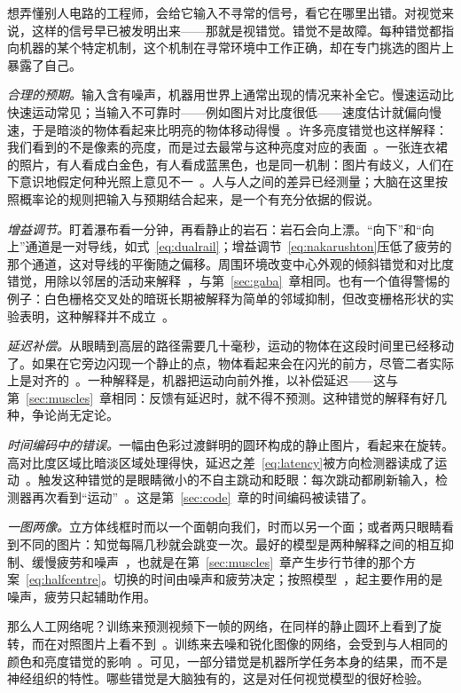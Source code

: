 想弄懂别人电路的工程师，会给它输入不寻常的信号，看它在哪里出错。对视觉来说，这样的信号早已被发明出来——那就是视错觉。错觉不是故障。每种错觉都指向机器的某个特定机制，这个机制在寻常环境中工作正确，却在专门挑选的图片上暴露了自己。

\emph{合理的预期。}输入含有噪声，机器用世界上通常出现的情况来补全它。慢速运动比快速运动常见；当输入不可靠时——例如图片对比度很低——速度估计就偏向慢速，于是暗淡的物体看起来比明亮的物体移动得慢~\cite{Weiss2002}。许多亮度错觉也这样解释：我们看到的不是像素的亮度，而是过去最常与这种亮度对应的表面~\cite{Purves2011}。一张连衣裙的照片，有人看成白金色，有人看成蓝黑色，也是同一机制：图片有歧义，人们在下意识地假定何种光照上意见不一~\cite{LaferSousa2015,Wallisch2017}。人与人之间的差异已经测量；大脑在这里按照概率论的规则把输入与预期结合起来，是一个有充分依据的假说。

\emph{增益调节。}盯着瀑布看一分钟，再看静止的岩石：岩石会向上漂。“向下”和“向上”通道是一对导线，如式~\eqref{eq:dualrail}；增益调节~\eqref{eq:nakarushton}压低了疲劳的那个通道，这对导线的平衡随之偏移。周围环境改变中心外观的倾斜错觉和对比度错觉，用除以邻居的活动来解释~\cite{Schwartz2009}，与第~\ref{sec:gaba}~章相同。也有一个值得警惕的例子：白色栅格交叉处的暗斑长期被解释为简单的邻域抑制，但改变栅格形状的实验表明，这种解释并不成立~\cite{SchillerCarvey2005}。

\emph{延迟补偿。}从眼睛到高层的路径需要几十毫秒，运动的物体在这段时间里已经移动了。如果在它旁边闪现一个静止的点，物体看起来会在闪光的前方，尽管二者实际上是对齐的~\cite{Nijhawan1994}。一种解释是，机器把运动向前外推，以补偿延迟——这与第~\ref{sec:muscles}~章相同：反馈有延迟时，就不得不预测。这种错觉的解释有好几种，争论尚无定论。

\emph{时间编码中的错误。}一幅由色彩过渡鲜明的圆环构成的静止图片，看起来在旋转。高对比度区域比暗淡区域处理得快，延迟之差~\eqref{eq:latency}被方向检测器读成了运动~\cite{Conway2005}。触发这种错觉的是眼睛微小的不自主跳动和眨眼：每次跳动都刷新输入，检测器再次看到“运动”~\cite{OteroMillan2012}。这是第~\ref{sec:code}~章的时间编码被读错了。

\emph{一图两像。}立方体线框时而以一个面朝向我们，时而以另一个面；或者两只眼睛看到不同的图片：知觉每隔几秒就会跳变一次。最好的模型是两种解释之间的相互抑制、缓慢疲劳和噪声~\cite{MorenoBote2007}，也就是在第~\ref{sec:muscles}~章产生步行节律的那个方案~\eqref{eq:halfcentre}。切换的时间由噪声和疲劳决定；按照模型~\cite{MorenoBote2007}，起主要作用的是噪声，疲劳只起辅助作用。

那么人工网络呢？训练来预测视频下一帧的网络，在同样的静止圆环上看到了旋转，而在对照图片上看不到~\cite{Watanabe2018}。训练来去噪和锐化图像的网络，会受到与人相同的颜色和亮度错觉的影响~\cite{GomezVilla2020}。可见，一部分错觉是机器所学任务本身的结果，而不是神经组织的特性。哪些错觉是大脑独有的，这是对任何视觉模型的很好检验。

